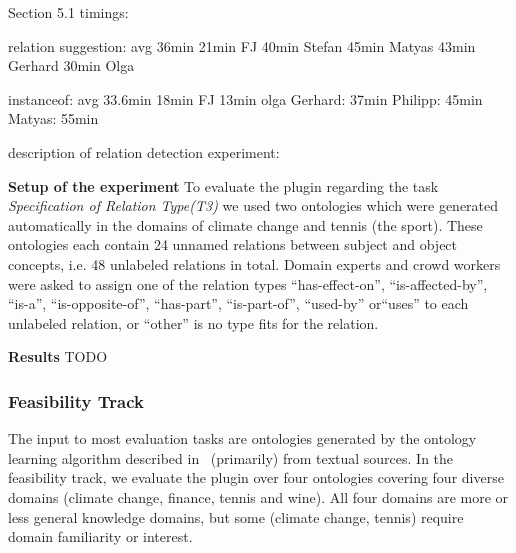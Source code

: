Section 5.1 timings: 

    relation suggestion: avg 36min
        21min  FJ
        40min  Stefan
        45min  Matyas 
        43min  Gerhard
        30min  Olga

    instanceof: avg 33.6min
        18min FJ
        13min olga
        Gerhard: 37min
        Philipp: 45min
        Matyas: 55min


description of relation detection experiment:

\textbf{Setup of the experiment}
To evaluate the plugin regarding the task \emph{Specification of Relation Type(T3)} we used two ontologies which were generated automatically
in the domains of climate change and tennis (the sport). These ontologies each contain 24 unnamed relations between subject and object concepts,
i.e. 48 unlabeled relations in total. Domain experts and crowd workers were asked to assign one of the relation types ``has-effect-on'', ``is-affected-by'', ``is-a'', ``is-opposite-of'', ``has-part'', ``is-part-of'', ``used-by'' or``uses'' to each unlabeled relation, or ``other'' is no type fits for the relation. 


\textbf{Results}
TODO


\subsubsection{Feasibility Track}The input to most evaluation tasks are ontologies generated by the ontology learning algorithm described in~\cite{wohlgenannt2012} (primarily) from textual sources. %
In the feasibility track, we evaluate the plugin over four ontologies covering four diverse domains (climate change, finance, tennis and wine).
All four domains are more or less general knowledge domains, but some (climate change, tennis) require domain familiarity or interest. 

